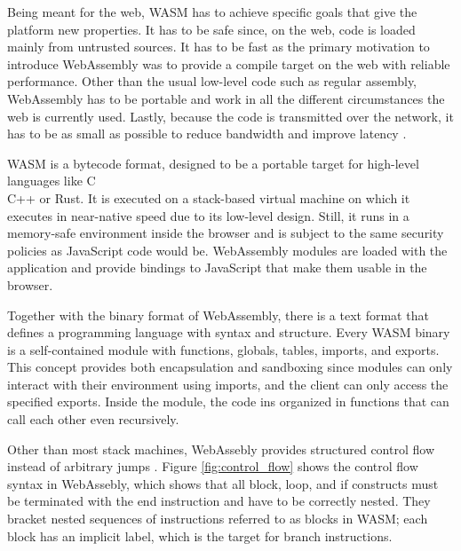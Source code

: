 Being meant for the web, WASM has to achieve specific goals that give the platform new properties. It has to be safe since, on the web, code is loaded mainly from untrusted sources. It has to be fast as the primary motivation to introduce WebAssembly was to provide a compile target on the web with reliable performance. Other than the usual low-level code such as regular assembly, WebAssembly has to be portable and work in all the different circumstances the web is currently used. Lastly, because the code is transmitted over the network, it has to be as small as possible to reduce bandwidth and improve latency \autocite{rossberg_bringing_2018}.

WASM is a bytecode format, designed to be a portable target for high-level languages like C\\C++ or Rust. It is executed on a stack-based virtual machine on which it executes in near-native speed due to its low-level design. Still, it runs in a memory-safe environment inside the browser and is subject to the same security policies as JavaScript code would be. WebAssembly modules are loaded with the application and provide bindings to JavaScript that make them usable in the browser.

Together with the binary format of WebAssembly, there is a text format that defines a programming language with syntax and structure. Every WASM binary is a self-contained module with functions, globals, tables, imports, and exports. This concept provides both encapsulation and sandboxing since modules can only interact with their environment using imports, and the client can only access the specified exports. Inside the module, the code ins organized in functions that can call each other even recursively.

Other than most stack machines, WebAssebly provides structured control flow instead of arbitrary jumps \autocite{noauthor_instructions_nodate}. Figure \ref{fig:control_flow} shows the control flow syntax in WebAssebly, which shows that all block, loop, and if constructs must be terminated with the end instruction and have to be correctly nested. They bracket nested sequences of instructions referred to as blocks in WASM; each block has an implicit label, which is the target for branch instructions.

